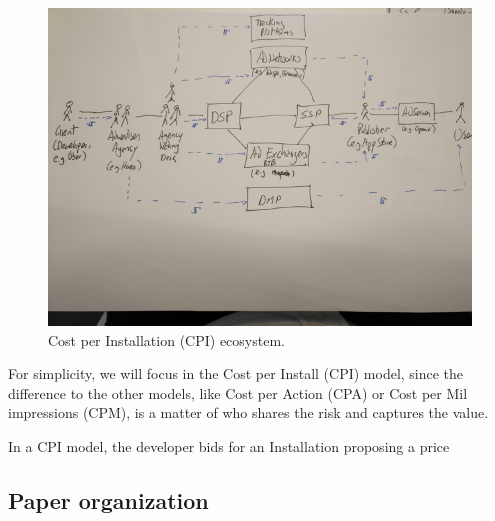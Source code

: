 \begin{figure}[!ht]
\centering
\includegraphics[width=\textwidth]{diagrams/cpi.png}
\caption{Cost per Installation (CPI) ecosystem.}
\label{fig:exist_flows}
\end{figure}


For simplicity, we will focus in the Cost per Install (CPI) model, since the difference to the other models, like Cost per Action (CPA) or Cost per Mil impressions (CPM), is a matter of who shares the risk and captures the value.

In a CPI model, the developer bids for an Installation proposing a price 






\subsection{Paper organization}


